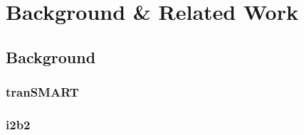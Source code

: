 \chapter{Background \& Related Work}

\section{Background}


\subsection{tranSMART}

\subsection{i2b2}
\label{sec:bg-i2b2}








